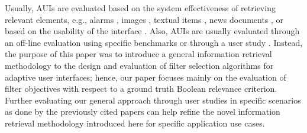 Usually, AUIs are evaluated based on the system effectiveness of retrieving relevant elements, e.g., alarms \cite{Amershi2011}, images \cite{Cui2008b,Fogarty2008}, textual items \cite{Tsandilas2005}, news documents \cite{Schrier2008}, 
or based on the usability of the interface \cite{Gajos2008,Gajos2010,Hartmann2008}.
Also, AUIs are usually evaluated through an off-line evaluation using specific benchmarks \cite{Amershi2011,Cui2008b,Harold2017}  or through a user study \cite{Amershi2011,Gajos2008,Hartmann2008,Fogarty2008,Tsandilas2005,Gajos2010}.
Instead, the purpose of this paper was to introduce a general information retrieval methodology to the design and evaluation of filter selection algorithms for adaptive user interfaces; hence, our paper focuses mainly on the evaluation of filter objectives with respect to a ground truth Boolean relevance criterion.  Further evaluating our general approach through user studies in specific scenarios as done by the previously cited papers can help refine the novel information retrieval methodology introduced here for specific application use cases.








